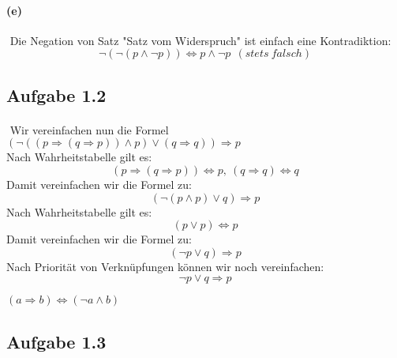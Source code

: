 \paragraph{(e)}
$ $\newline
Die Negation von Satz "Satz vom Widerspruch" ist einfach eine Kontradiktion:
\begin{equation*}
\neg (\neg (p\wedge \neg p))\Leftrightarrow p\wedge \neg p\ \ (stets\ falsch)
\end{equation*}

\newpage

\subsection{Aufgabe 1.2}

\paragraph{}
\begin{solution}
$ $\newline
Wir vereinfachen nun die Formel $(\neg ((p\Rightarrow (q\Rightarrow p))\wedge p)\vee (q\Rightarrow q))\Rightarrow p$ \\
Nach Wahrheitstabelle gilt es:
\begin{equation*}
(p\Rightarrow (q\Rightarrow p))\Leftrightarrow p,\ (q\Rightarrow q)\Leftrightarrow q
\end{equation*}
Damit vereinfachen wir die Formel zu:
\begin{equation}
(\neg (p\wedge p)\vee q)\Rightarrow p
\end{equation}
Nach Wahrheitstabelle gilt es:
\begin{equation*}
(p\vee p)\Leftrightarrow p
\end{equation*}
Damit vereinfachen wir die Formel zu:
\begin{equation}
(\neg p\vee q)\Rightarrow p
\end{equation}
Nach Priorität von Verknüpfungen können wir noch vereinfachen:
\begin{equation}
\neg p\vee q\Rightarrow p
\end{equation}
\end{solution}
\begin{remark}
$(a\Rightarrow b)\Leftrightarrow(\neg a\wedge b)$
\end{remark}

\newpage

\subsection{Aufgabe 1.3}


